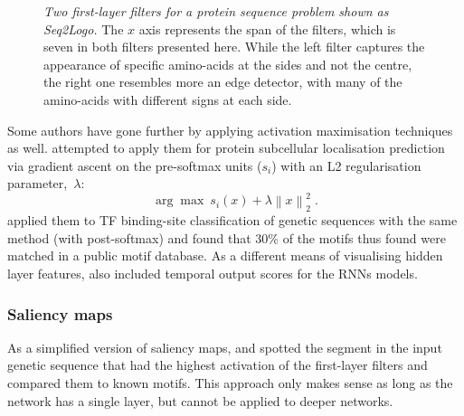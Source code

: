 \begin{figure}
	\centering
	\caption{\textit{Two first-layer filters for a protein sequence problem shown as Seq2Logo.} The $x$ axis represents the span of the filters, which is seven in both filters presented here. While the left filter captures the appearance of specific amino-acids at the sides and not the centre, the right one resembles more an edge detector, with many of the amino-acids with different signs at each side.}
	\label{fig:seqlogo}
\end{figure}

Some authors have gone further by applying activation maximisation techniques as well. \cite{Fontal2017} attempted to apply them for protein subcellular localisation prediction via gradient ascent on the pre-softmax units ($s_i$) with an L2 regularisation parameter,~$\lambda$:
\begin{equation}
\arg\max \: s_i(x) + \lambda \left\| x \right\|_2^2 \; .
\end{equation}
\cite{Lanchantin2016} applied them to TF binding-site classification of genetic sequences with the same method (with post-softmax) and found that 30\% of the motifs thus found were matched in a public motif database. As a different means of visualising hidden layer features, \cite{Lanchantin2016} also included temporal output scores for the RNNs models.

\subsubsection*{Saliency maps}
As a simplified version of saliency maps, \cite{Alipanahi2015} and \cite{Quang2016} spotted the segment in the input genetic sequence that had the highest activation of the first-layer filters and compared them to known motifs. This approach only makes sense as long as the network has a single layer, but cannot be applied to deeper networks.

